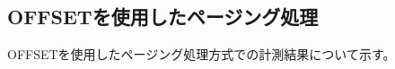 \documentclass[../../../main]{subfiles}
\begin{document}
    \subsection{OFFSETを使用したページング処理}\label{subsec:result-paging-offset}

    OFFSETを使用したページング処理方式での計測結果について示す。

    
    
    

    

    

    
\end{document}
